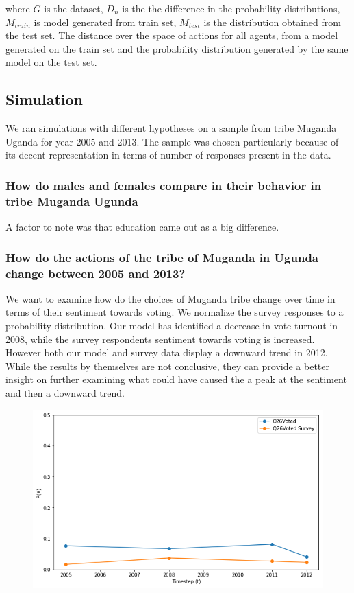 {where $G$ is the dataset, $D_n$ is the the difference in the probability distributions, $M_{train}$ is model generated from train set, $M_{test}$ is the distribution obtained from the test set. The distance over the space of actions for all agents, from a model generated on the train set and the probability distribution generated by the same model on the test set.

\subsection{Simulation}

We ran simulations with different hypotheses on a sample from tribe Muganda Uganda for year 2005 and 2013. The sample was chosen particularly because of its decent representation in terms of number of responses present in the data.    
\subsubsection{How do males and females compare in their behavior in tribe Muganda Ugunda}
A factor to note was that education came out as a big difference. 



\subsubsection{How do the actions of the tribe of  Muganda in Ugunda change between 2005 and 2013?}
We want to examine how do the choices of Muganda tribe change over time in terms of their sentiment towards voting. We normalize the survey responses to a probability distribution. Our model has identified a decrease in vote turnout in 2008, while the survey respondents sentiment towards voting is increased. However both our model and survey data display a downward trend in 2012. While the results by themselves are not conclusive, they can provide a better insight on further examining what could have caused the a peak at the sentiment and then a downward trend.  

\begin{figure}
	\centering
	\includegraphics[width=0.7\linewidth]{Images/voted}
	\caption{}
	\label{fig:voted}
\end{figure}


}

